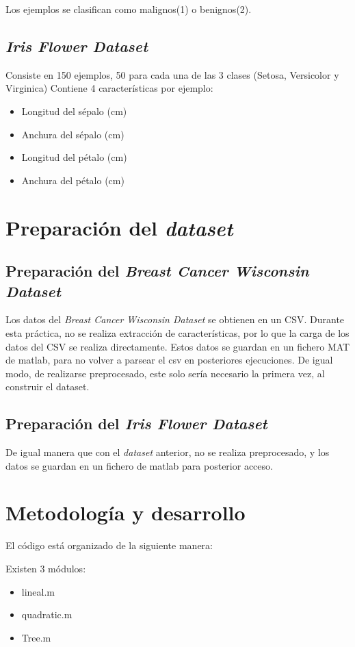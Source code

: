\documentclass[a4paper,openwrite,12pt]{article}
\begin{document}
Los ejemplos se clasifican como malignos(1) o benignos(2).

\subsection{\textit{Iris Flower Dataset}}
Consiste en 150 ejemplos, 50 para cada una de las 3 clases (Setosa, Versicolor y Virginica)
Contiene 4 características por ejemplo:
\begin{itemize}
    \item Longitud del sépalo (cm)
    \item Anchura del sépalo (cm)
    \item Longitud del pétalo (cm)
    \item Anchura del pétalo (cm)
\end{itemize}

\section{Preparación del \textit{dataset}}
\subsection{Preparación del \textit{Breast Cancer Wisconsin Dataset}}
Los datos del \textit{Breast Cancer Wisconsin Dataset} se obtienen en un CSV.
Durante esta práctica, no se realiza extracción de características, por lo que la carga de los datos del CSV se realiza directamente. Estos datos se guardan en un fichero MAT de matlab, para no volver a parsear el csv en posteriores ejecuciones. De igual modo, de realizarse preprocesado, este solo sería necesario la primera vez, al construir el dataset.

\subsection{Preparación del \textit{Iris Flower Dataset}}
De igual manera que con el \textit{dataset} anterior, no se realiza preprocesado, y los datos se guardan en un fichero de matlab para posterior acceso.


\section{Metodología y desarrollo}

El código está organizado de la siguiente manera:

Existen 3 módulos:

\begin{itemize}
    \item lineal.m
    \item quadratic.m
    \item Tree.m
\end{itemize}
\end{document}
